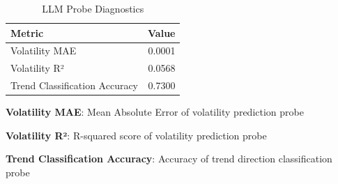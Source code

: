 \begin{table}[htbp]
\centering
\caption{LLM Probe Diagnostics}
\label{tab:llm_probe_diagnostics}
\begin{tabular}{lr}
\toprule
\textbf{Metric} & \textbf{Value} \\
\midrule
Volatility MAE & 0.0001 \\
Volatility R² & 0.0568 \\
Trend Classification Accuracy & 0.7300 \\
\bottomrule
\end{tabular}
\begin{tablenotes}
\small
\item \textbf{Volatility MAE}: Mean Absolute Error of volatility prediction probe
\item \textbf{Volatility R²}: R-squared score of volatility prediction probe  
\item \textbf{Trend Classification Accuracy}: Accuracy of trend direction classification probe
\end{tablenotes}
\end{table}